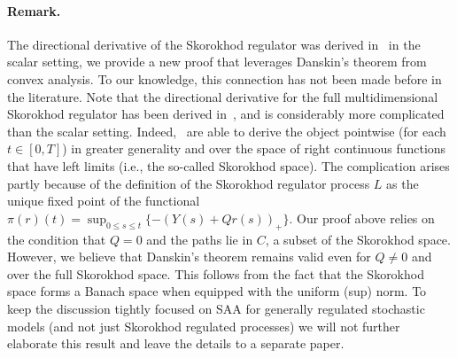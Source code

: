 \documentclass[11pt,leqno]{amsart}
\begin{document}
\paragraph{Remark.} The directional derivative of the Skorokhod regulator was derived in~\cite{MM,Whitt_2002_supplement} in the scalar setting, we provide a new proof that leverages Danskin's theorem from convex analysis. To our knowledge, this connection has not been made before in the literature. Note that the directional derivative for the full multidimensional Skorokhod regulator has been derived in~\cite{MR}, and is considerably more complicated than the scalar setting. Indeed,~\cite{MR} are able to derive the object pointwise (for each $t \in [0,T]$) in greater generality and over the space of right continuous functions that have left limits (i.e., the so-called Skorokhod space). The complication arises partly because of the definition of the Skorokhod regulator process $L$ as the unique fixed point of the functional $\pi(r)(t) = \sup_{0 \leq s \leq t} \{-(Y(s) + Q r(s))_+\}$. Our proof above relies on the condition that $Q = 0$ and the paths lie in $C$, a subset of the Skorokhod space. However, we believe that Danskin's theorem remains valid even for $Q \neq 0$ and over the full Skorokhod space. This follows from the fact that the Skorokhod space forms a Banach space when equipped with the uniform (sup) norm. To keep the discussion tightly focused on SAA for generally regulated stochastic models (and not just Skorokhod regulated processes) we will not further elaborate this result and leave the details to a separate paper.
\end{document}
